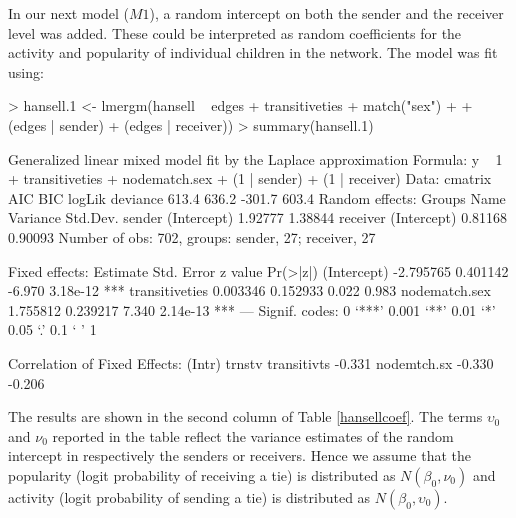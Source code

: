 \documentclass[a4paper]{article}
\begin{document}
In our next model ($M1$), a random intercept on both the sender and the receiver level was added. These could be interpreted as 
random coefficients for the activity and popularity of individual children in the network. The model was fit using: 
\begin{Schunk}
\begin{Sinput}
> hansell.1 <- lmergm(hansell ~ edges + transitiveties + match("sex") + 
+     (edges | sender) + (edges | receiver))
> summary(hansell.1)
\end{Sinput}
\begin{Soutput}
Generalized linear mixed model fit by the Laplace approximation 
Formula: y ~ 1 + transitiveties + nodematch.sex + (1 | sender) + (1 |      receiver) 
   Data: cmatrix 
   AIC   BIC logLik deviance
 613.4 636.2 -301.7    603.4
Random effects:
 Groups   Name        Variance Std.Dev.
 sender   (Intercept) 1.92777  1.38844 
 receiver (Intercept) 0.81168  0.90093 
Number of obs: 702, groups: sender, 27; receiver, 27

Fixed effects:
                Estimate Std. Error z value Pr(>|z|)    
(Intercept)    -2.795765   0.401142  -6.970 3.18e-12 ***
transitiveties  0.003346   0.152933   0.022    0.983    
nodematch.sex   1.755812   0.239217   7.340 2.14e-13 ***
---
Signif. codes:  0 ‘***’ 0.001 ‘**’ 0.01 ‘*’ 0.05 ‘.’ 0.1 ‘ ’ 1 

Correlation of Fixed Effects:
            (Intr) trnstv
transitivts -0.331       
nodemtch.sx -0.330 -0.206
\end{Soutput}
\end{Schunk}
The results are shown in the second column of Table \ref{hansellcoef}. The terms $\upsilon_0$ and $\nu_0$ reported in the table reflect the variance 
estimates of the random intercept in respectively the senders or receivers. Hence we assume that the popularity (logit probability 
of receiving a tie) is distributed as $N(\beta_0, \nu_0)$ and activity (logit probability of sending a tie) is distributed as 
$N(\beta_0, \upsilon_0)$. \\
\end{document}

